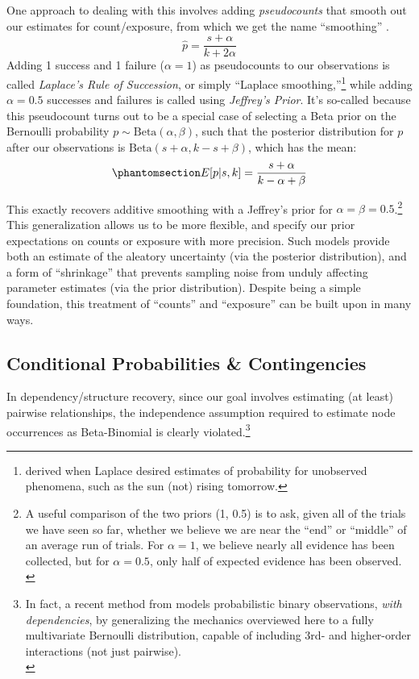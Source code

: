 \documentclass[%
	12pt,
		oneside,
		letterpaper
]{book}
\begin{document}
One approach to dealing with this involves adding \emph{pseudocounts}
that smooth out our estimates for count/exposure, from which we get the
name ``smoothing''
\autocite[45-53]{SpeechLanguageProcessing_Jurafsky2025}.
\[\hat{p} = \frac{s+\alpha}{k+2\alpha} \] Adding 1 success and 1 failure
(\(\alpha=1\)) as pseudocounts to our observations is called
\emph{Laplace's Rule of Succession}, or simply ``Laplace
smoothing,''\footnote{ derived when Laplace desired estimates of
  probability for unobserved phenomena, such as the sun (not) rising
  tomorrow.} while adding \(\alpha=0.5\) successes and failures is
called using \emph{Jeffrey's Prior}. It's so-called because this
pseudocount turns out to be a special case of selecting a Beta prior on
the Bernoulli probability \(p\sim \textrm{Beta}(\alpha, \beta)\), such
that the posterior distribution for \(p\) after our observations is
\(\textrm{Beta}(s+\alpha, k-s+\beta)\), which has the mean:
\begin{equation}\phantomsection\label{eq-beta-binomial}{
E[p|s,k]=\frac{s+\alpha}{k-\alpha+\beta}
}\end{equation}

This exactly recovers additive smoothing with a Jeffrey's prior for
\(\alpha=\beta=0.5\).\footnote{ A useful comparison of the two priors
  (1, 0.5) is to ask, given all of the trials we have seen so far,
  whether we believe we are near the ``end'' or ``middle'' of an average
  run of trials. For \(\alpha=1\), we believe nearly all evidence has
  been collected, but for \(\alpha=0.5\), only half of expected evidence
  has been observed.\\
} This generalization allows us to be more flexible, and specify our
prior expectations on counts or exposure with more precision. Such
models provide both an estimate of the aleatory uncertainty (via the
posterior distribution), and a form of ``shrinkage'' that prevents
sampling noise from unduly affecting parameter estimates (via the prior
distribution). Despite being a simple foundation, this treatment of
``counts'' and ``exposure'' can be built upon in many ways.

\subsection{Conditional Probabilities \&
Contingencies}\label{conditional-probabilities-contingencies}

In dependency/structure recovery, since our goal involves estimating (at
least) pairwise relationships, the independence assumption required to
estimate node occurrences as Beta-Binomial is clearly
violated.\footnote{ In fact, a recent method from
  \autocite{MultivariateBernoullidistribution_Dai2013} models
  probabilistic binary observations, \emph{with dependencies}, by
  generalizing the mechanics overviewed here to a fully multivariate
  Bernoulli distribution, capable of including 3rd- and higher-order
  interactions (not just pairwise).\\
}
\end{document}
